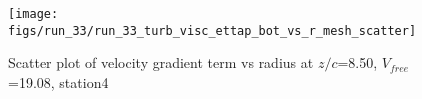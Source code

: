 \begin{figure}[H]
\centering
\texttt{[image: figs/run\_33/run\_33\_turb\_visc\_ettap\_bot\_vs\_r\_mesh\_scatter]}
\caption{Scatter plot of velocity gradient term vs radius at $z/c$=8.50, $V_{free}$=19.08, station4}
\label{fig:run_33_turb_visc_ettap_bot_vs_r_mesh_scatter}
\end{figure}


